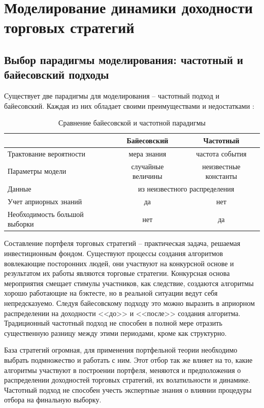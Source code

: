 \chapter{Моделирование динамики доходности торговых стратегий}
\section{Выбор парадигмы моделирования: частотный и байесовский подходы}
Существует две парадигмы для моделирования -- частотный подход и байесовский. Каждая из них обладает своими преимуществами и недостатками \citep{gelman2008}:
\begin{table}[h]
\centering
\caption{Сравнение байесовской и частотной парадигмы}
	\begin{tabular}{l|c|c}
	& Байесовский  & Частотный \\ \hline
	Трактование вероятности & мера знания & частота события \\ \hline
	Параметры модели & случайные величины & неизвестные константы \\ \hline
	Данные & \multicolumn{2}{c}{из неизвестного распределения}  \\ \hline
	Учет априорных знаний & да & нет \\ \hline
	Необходимость большой выборки & нет & да
 	\end{tabular}
\end{table}

Составление портфеля торговых стратегий -- практическая задача, решаемая инвестиционным фондом. Существуют процессы создания алгоритмов вовлекающие посторонних людей, они участвуют на конкурсной основе и результатом их работы являются торговые стратегии. Конкурсная основа мероприятия смещает стимулы участников, как следствие, создаются алгоритмы хорошо работающие на бэктесте, но в реальной ситуации ведут себя непредсказуемо. Следуя байесовскому подходу это можно выразить в априорном распределении на доходности <<до>> и <<после>> создания алгоритма. Традиционный частотный подход не способен в полной мере отразить существенную разницу между этими периодами, кроме как структурно.

База стратегий огромная, для применения портфельной теории необходимо выбрать подмножество и работать с ним. Этот отбор так же влияет на то, какие алгоритмы участвуют в построении портфеля, меняются и предположения о распределении доходностей торговых стратегий, их волатильности и динамике. Частотный подход не способен учесть экспертные знания о влиянии процедуры отбора на финальную выборку.

